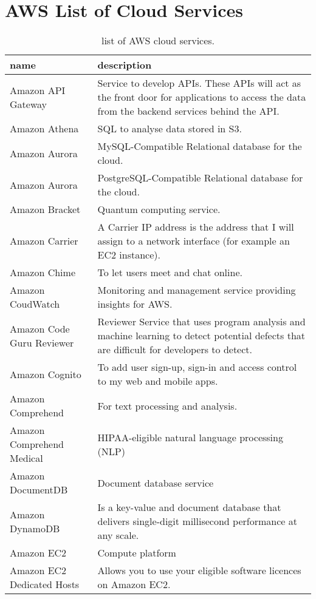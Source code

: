 \documentclass[]{book}
\begin{document}
\section{AWS List of Cloud Services}\label{aws-list-of-cloud-services}

\begin{table}

\caption{\label{tab:unnamed-chunk-84}list of AWS cloud services.}
\centering
\begin{tabular}[t]{ll}
\toprule
name & description\\
\midrule
Amazon API Gateway & Service to develop APIs. These APIs will act as the front door for applications to access the data from the backend services behind the API.\\
Amazon Athena & SQL to analyse data stored in S3.\\
Amazon Aurora & MySQL-Compatible    Relational database for the cloud.\\
Amazon Aurora & PostgreSQL-Compatible   Relational database for the cloud.\\
Amazon Bracket & Quantum computing service.\\
\addlinespace
Amazon Carrier & A Carrier IP address is the address that I will assign to a network interface (for example an EC2 instance).\\
Amazon Chime & To let users meet and chat online.\\
Amazon CoudWatch & Monitoring and management service providing insights for AWS.\\
Amazon Code Guru Reviewer & Reviewer    Service that uses program analysis and machine learning to detect potential defects that are difficult for developers to detect.\\
Amazon Cognito & To add user sign-up, sign-in and access control to my web and mobile apps.\\
\addlinespace
Amazon Comprehend & For text processing and analysis.\\
Amazon Comprehend Medical & HIPAA-eligible natural language processing (NLP)\\
Amazon DocumentDB & Document database service\\
Amazon DynamoDB & Is a key-value and document database that delivers single-digit millisecond performance at any scale.\\
Amazon EC2 & Compute platform\\
\addlinespace
Amazon EC2 Dedicated Hosts & Allows you to use your eligible software licences on Amazon EC2.\\

\end{tabular}
\end{table}
\end{document}
